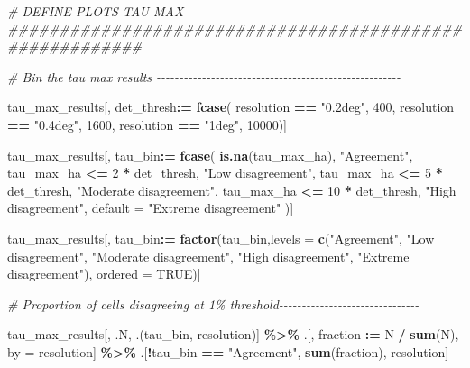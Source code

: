 \documentclass[
  11pt,
]{article}
\newenvironment{Shaded}{\begin{snugshade}}{\end{snugshade}}
\newcommand{\AttributeTok}[1]{\textcolor[rgb]{0.13,0.29,0.53}{#1}}
\newcommand{\CommentTok}[1]{\textcolor[rgb]{0.56,0.35,0.01}{\textit{#1}}}
\newcommand{\ConstantTok}[1]{\textcolor[rgb]{0.56,0.35,0.01}{#1}}
\newcommand{\DecValTok}[1]{\textcolor[rgb]{0.00,0.00,0.81}{#1}}
\newcommand{\FunctionTok}[1]{\textcolor[rgb]{0.13,0.29,0.53}{\textbf{#1}}}
\newcommand{\NormalTok}[1]{#1}
\newcommand{\OtherTok}[1]{\textcolor[rgb]{0.56,0.35,0.01}{#1}}
\newcommand{\SpecialCharTok}[1]{\textcolor[rgb]{0.81,0.36,0.00}{\textbf{#1}}}
\newcommand{\StringTok}[1]{\textcolor[rgb]{0.31,0.60,0.02}{#1}}
\begin{document}
\begin{Shaded}
\begin{Highlighting}[]
\CommentTok{\# DEFINE PLOTS TAU MAX \#\#\#\#\#\#\#\#\#\#\#\#\#\#\#\#\#\#\#\#\#\#\#\#\#\#\#\#\#\#\#\#\#\#\#\#\#\#\#\#\#\#\#\#\#\#\#\#\#\#\#\#\#\#\#\#\#}

\CommentTok{\# Bin the tau max results {-}{-}{-}{-}{-}{-}{-}{-}{-}{-}{-}{-}{-}{-}{-}{-}{-}{-}{-}{-}{-}{-}{-}{-}{-}{-}{-}{-}{-}{-}{-}{-}{-}{-}{-}{-}{-}{-}{-}{-}{-}{-}{-}{-}{-}{-}{-}{-}{-}{-}{-}{-}{-}{-}}

\NormalTok{tau\_max\_results[, det\_thresh}\SpecialCharTok{:=} \FunctionTok{fcase}\NormalTok{(}
\NormalTok{  resolution }\SpecialCharTok{==} \StringTok{"0.2deg"}\NormalTok{, }\DecValTok{400}\NormalTok{,}
\NormalTok{  resolution }\SpecialCharTok{==} \StringTok{"0.4deg"}\NormalTok{, }\DecValTok{1600}\NormalTok{,}
\NormalTok{  resolution }\SpecialCharTok{==} \StringTok{"1deg"}\NormalTok{, }\DecValTok{10000}\NormalTok{)]}

\NormalTok{tau\_max\_results[, tau\_bin}\SpecialCharTok{:=} \FunctionTok{fcase}\NormalTok{(}
  \FunctionTok{is.na}\NormalTok{(tau\_max\_ha), }\StringTok{"Agreement"}\NormalTok{,}
\NormalTok{  tau\_max\_ha }\SpecialCharTok{\textless{}=} \DecValTok{2} \SpecialCharTok{*}\NormalTok{ det\_thresh, }\StringTok{"Low disagreement"}\NormalTok{,}
\NormalTok{  tau\_max\_ha }\SpecialCharTok{\textless{}=} \DecValTok{5} \SpecialCharTok{*}\NormalTok{ det\_thresh, }\StringTok{"Moderate disagreement"}\NormalTok{,}
\NormalTok{  tau\_max\_ha }\SpecialCharTok{\textless{}=} \DecValTok{10} \SpecialCharTok{*}\NormalTok{ det\_thresh, }\StringTok{"High disagreement"}\NormalTok{,}
  \AttributeTok{default =} \StringTok{"Extreme disagreement"}
\NormalTok{)]}

\NormalTok{tau\_max\_results[, tau\_bin}\SpecialCharTok{:=} \FunctionTok{factor}\NormalTok{(tau\_bin,}\AttributeTok{levels =} \FunctionTok{c}\NormalTok{(}\StringTok{"Agreement"}\NormalTok{,}
                                                       \StringTok{"Low disagreement"}\NormalTok{,}
                                                       \StringTok{"Moderate disagreement"}\NormalTok{,}
                                                       \StringTok{"High disagreement"}\NormalTok{,}
                                                       \StringTok{"Extreme disagreement"}\NormalTok{),}
                                    \AttributeTok{ordered =} \ConstantTok{TRUE}\NormalTok{)]}

\CommentTok{\# Proportion of cells disagreeing at 1\% threshold{-}{-}{-}{-}{-}{-}{-}{-}{-}{-}{-}{-}{-}{-}{-}{-}{-}{-}{-}{-}{-}{-}{-}{-}{-}{-}{-}{-}{-}{-}{-}}

\NormalTok{tau\_max\_results[, .N, .(tau\_bin, resolution)] }\SpecialCharTok{\%\textgreater{}\%}
\NormalTok{  .[, fraction }\SpecialCharTok{:=}\NormalTok{ N }\SpecialCharTok{/} \FunctionTok{sum}\NormalTok{(N), by }\OtherTok{=}\NormalTok{ resolution] }\SpecialCharTok{\%\textgreater{}\%}
\NormalTok{  .[}\SpecialCharTok{!}\NormalTok{tau\_bin }\SpecialCharTok{==} \StringTok{"Agreement"}\NormalTok{, }\FunctionTok{sum}\NormalTok{(fraction), resolution]}
\end{Highlighting}
\end{Shaded}
\end{document}
